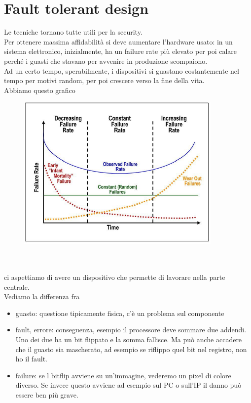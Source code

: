\documentclass[oneside, 12pt]{extbook}
\begin{document}
\section{Fault tolerant design}
Le tecniche tornano tutte utili per la security.
\\Per ottenere massima affidabilità si deve aumentare l'hardware usato: in un sistema elettronico, inizialmente, ha un failure rate più elevato per poi calare perché i guasti che stavano per avvenire in produzione scompaiono.
\\Ad un certo tempo, sperabilmente, i dispositivi si guastano costantemente nel tempo per motivi random, per poi crescere verso la fine della vita.
\\Abbiamo questo grafico\\
\begin{figure}[!h]
	\includegraphics[scale=.7]{immagini/hardware/tempo_vita.png}
\end{figure}
\\\\ci aspettiamo di avere un dispositivo che permette di lavorare nella parte centrale.
\\Vediamo la differenza fra
\begin{itemize}
	\item guasto: questione tipicamente fisica, c'è un problema sul componente
	\item fault, errore: conseguenza, esempio il processore deve sommare due addendi. Uno dei due ha un bit flippato e la somma fallisce. Ma può anche accadere che il guasto sia mascherato, ad esempio se riflippo quel bit nel registro, non ho il fault.
	\item failure: se l bitflip avviene su un'immagine, vederemo un pixel di colore diverso. Se invece questo avviene ad esempio sul PC o sull'IP il danno può essere ben più grave.
\end{itemize}
\end{document}
